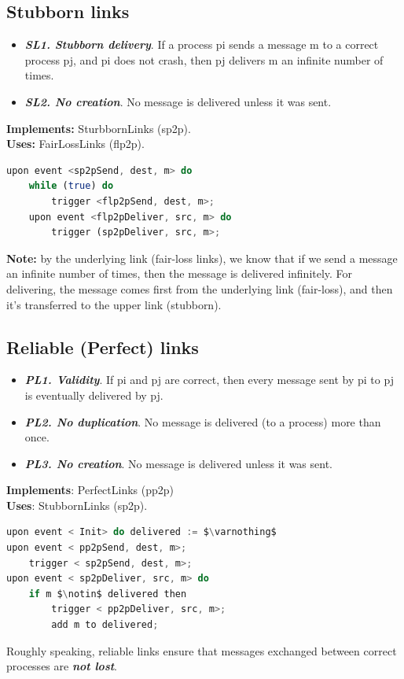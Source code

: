 \documentclass[11pt]{article}
\begin{document}
\subsection*{Stubborn links}
\begin{itemize}
	\item \textbf{\textit{SL1. Stubborn delivery}}. If a process pi sends a message m to a correct process pj, and pi does not crash, then pj delivers m an infinite number of times.
	\item \textbf{\textit{SL2. No creation}}. No message is delivered unless it was sent. 
\end{itemize}

\textbf{Implements:} SturbbornLinks (sp2p). \\
\textbf{Uses:} FairLossLinks (flp2p).
\begin{lstlisting}[language=Octave]
upon event <sp2pSend, dest, m> do
	while (true) do
		trigger <flp2pSend, dest, m>; 
	upon event <flp2pDeliver, src, m> do
		trigger (sp2pDeliver, src, m>;
\end{lstlisting}

\textbf{Note:} by the underlying link (fair-loss links), we know that if we send a message an infinite number of times, then the message is delivered infinitely. For delivering, the message comes first from the underlying link (fair-loss), and then it's transferred to the upper link (stubborn). 

\subsection*{Reliable (Perfect) links}

\begin{itemize}
	\item \textbf{\textit{PL1. Validity}}. If pi and pj are correct, then every message sent by pi to pj is eventually delivered by pj. 
	\item \textbf{\textit{PL2. No duplication}}. No message is delivered (to a process) more than once.
	\item \textbf{\textit{PL3. No creation}}. No message is delivered unless it was sent. 
\end{itemize}
\textbf{Implements}: PerfectLinks (pp2p) \\
\textbf{Uses}: StubbornLinks (sp2p).
\begin{lstlisting}[language=Octave, mathescape=true]
upon event < Init> do delivered := $\varnothing$
upon event < pp2pSend, dest, m>; 
	trigger < sp2pSend, dest, m>; 
upon event < sp2pDeliver, src, m> do
	if m $\notin$ delivered then
		trigger < pp2pDeliver, src, m>;
		add m to delivered;
\end{lstlisting}

Roughly speaking, reliable links ensure that messages exchanged between correct processes are \textbf{\textit{not lost}}.
\end{document}
